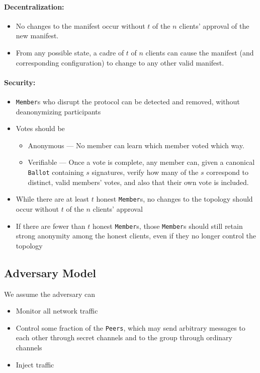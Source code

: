 \paragraph{Decentralization:}
\begin{itemize}
  \item No changes to the manifest occur without $t$ of the $n$ clients'
    approval of the new manifest.
  \item From any possible state, a cadre of $t$ of $n$ clients can cause the
    manifest (and corresponding configuration) to change to any other valid
    manifest.
\end{itemize}
\paragraph{Security:}
\begin{itemize}
  \item \texttt{Member}s who disrupt the protocol can be detected and removed,
    without deanonymizing participants
  \item  Votes should be
  \begin{itemize}
    \item Anonymous --- No member can learn which member voted which way.
    \item Verifiable --- Once a vote is complete, any member can, given
      a canonical \texttt{Ballot} containing $s$ signatures, verify how many
      of the $s$ correspond to distinct, valid members' votes, and also that
      their own vote is included.
  \end{itemize}
  \item While there are at least $t$ honest \texttt{Member}s, no changes to the
    topology should occur without $t$ of the $n$ clients' approval
  \item If there are fewer than $t$ honest \texttt{Member}s, those
    \texttt{Member}s should still retain strong anonymity among the honest
    clients, even if they no longer control the topology
\end{itemize}
\subsection{Adversary Model}
We assume the adversary can
\begin{itemize}
  \item Monitor all network traffic
  \item Control some fraction of the \texttt{Peers}, which may send arbitrary
    messages to each other through secret channels and to the group through
    ordinary channels
  \item Inject traffic
\end{itemize}
